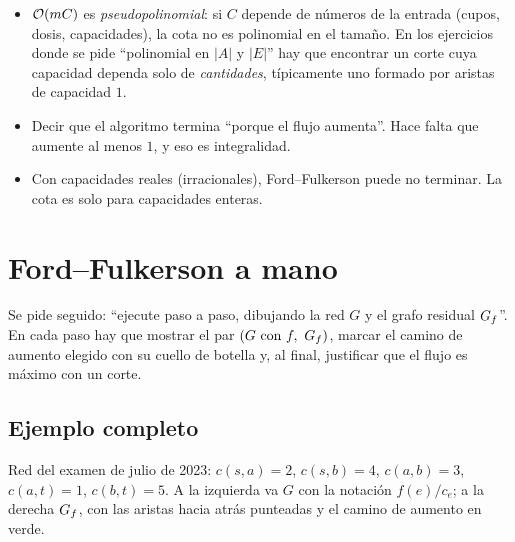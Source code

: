 \begin{trampa}
\begin{itemize}
  \item $\mathcal{O}(mC)$ es \emph{pseudopolinomial}: si $C$ depende de números de la entrada (cupos, dosis, capacidades), la cota no es polinomial en el tamaño. En los ejercicios donde se pide ``polinomial en $|A|$ y $|E|$'' hay que encontrar un corte cuya capacidad dependa solo de \emph{cantidades}, típicamente uno formado por aristas de capacidad $1$.
  \item Decir que el algoritmo termina ``porque el flujo aumenta''. Hace falta que aumente al menos $1$, y eso es integralidad.
  \item Con capacidades reales (irracionales), Ford–Fulkerson puede no terminar. La cota es solo para capacidades enteras.
\end{itemize}
\end{trampa}

\section{Ford–Fulkerson a mano}

Se pide seguido: ``ejecute paso a paso, dibujando la red $G$ y el grafo residual $G_f$''. En cada paso hay que mostrar el par $(G\text{ con } f,\ G_f)$, marcar el camino de aumento elegido con su cuello de botella y, al final, justificar que el flujo es máximo con un corte.

\subsection{Ejemplo completo}

Red del examen de julio de 2023: $c(s,a)=2$, $c(s,b)=4$, $c(a,b)=3$, $c(a,t)=1$, $c(b,t)=5$. A la izquierda va $G$ con la notación $f(e)/c_e$; a la derecha $G_f$, con las aristas hacia atrás punteadas y el camino de aumento en verde.

\begin{center}
\hspace{1.3cm}%
\end{center}

